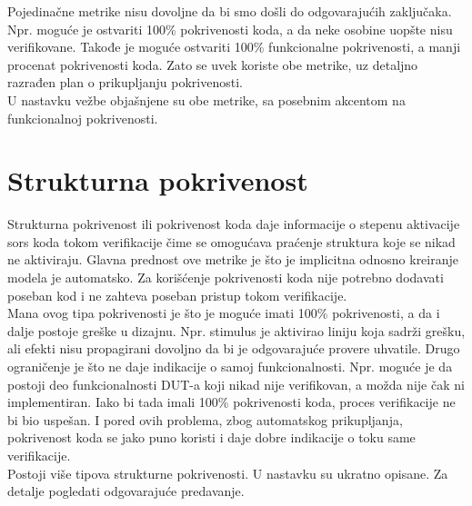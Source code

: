 Pojedinačne metrike nisu dovoljne da bi smo došli do odgovarajućih zaključaka.
Npr. moguće je ostvariti 100\% pokrivenosti koda, a da neke osobine uopšte nisu
verifikovane. Takođe je moguće ostvariti 100\% funkcionalne pokrivenosti, a
manji procenat pokrivenosti koda. Zato se uvek koriste obe metrike, uz detaljno
razrađen plan o prikupljanju pokrivenosti.\\

U nastavku vežbe objašnjene su obe metrike, sa posebnim akcentom na
funkcionalnoj pokrivenosti.


\section{Strukturna pokrivenost}

Strukturna pokrivenost ili pokrivenost koda daje informacije o stepenu
aktivacije sors koda tokom verifikacije čime se omogućava praćenje struktura
koje se nikad ne aktiviraju. Glavna prednost ove metrike je što je implicitna
odnosno kreiranje modela je automatsko. Za korišćenje pokrivenosti koda nije
potrebno dodavati poseban kod i ne zahteva poseban pristup tokom verifikacije.\\

Mana ovog tipa pokrivenosti je što je moguće imati 100\% pokrivenosti, a da i
dalje postoje greške u dizajnu. Npr. stimulus je aktivirao liniju koja sadrži
grešku, ali efekti nisu propagirani dovoljno da bi je odgovarajuće provere
uhvatile. Drugo ograničenje je što ne daje indikacije o samoj funkcionalnosti.
Npr. moguće je da postoji deo funkcionalnosti DUT-a koji nikad nije verifikovan,
a možda nije čak ni implementiran. Iako bi tada imali 100\% pokrivenosti koda,
proces verifikacije ne bi bio uspešan. I pored ovih problema, zbog automatskog
prikupljanja, pokrivenost koda se jako puno koristi i daje dobre indikacije o
toku same verifikacije.\\

Postoji više tipova strukturne pokrivenosti. U nastavku su ukratno opisane. Za
detalje pogledati odgovarajuće predavanje.

